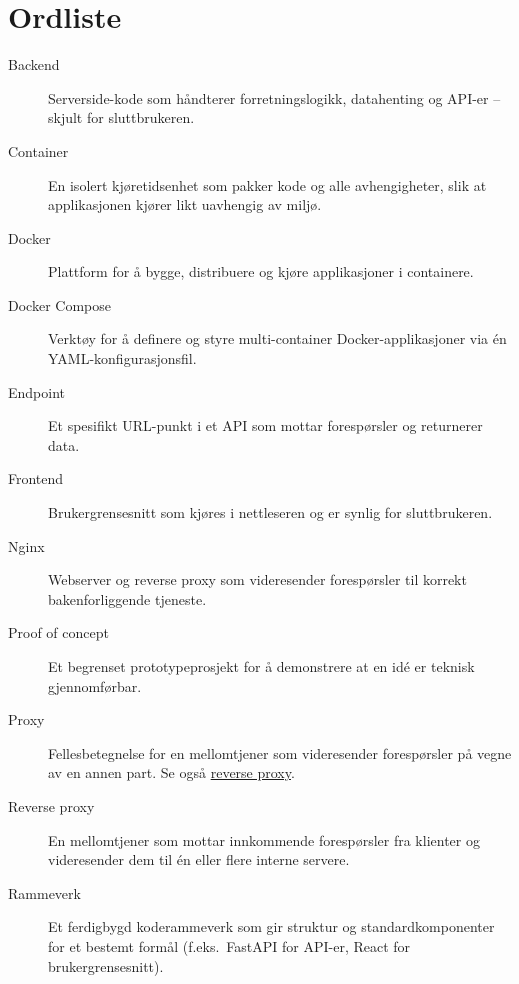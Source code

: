 \section*{Ordliste}

\begin{description}
    \item[\hypertarget{ord:backend}{Backend}] Serverside-kode som håndterer
        forretningslogikk, datahenting og API-er -- skjult for sluttbrukeren.

    \item[\hypertarget{ord:container}{Container}] En isolert kjøretidsenhet som
        pakker kode og alle avhengigheter, slik at applikasjonen kjører likt
        uavhengig av miljø.

    \item[\hypertarget{ord:docker}{Docker}] Plattform for å bygge, distribuere og
        kjøre applikasjoner i containere.

    \item[\hypertarget{ord:docker-compose}{Docker Compose}] Verktøy for å definere
        og styre multi-container Docker-applikasjoner via én YAML-konfigurasjonsfil.

    \item[\hypertarget{ord:endpoint}{Endpoint}] Et spesifikt URL-punkt i et API som
        mottar forespørsler og returnerer data.

    \item[\hypertarget{ord:frontend}{Frontend}] Brukergrensesnitt som kjøres i
        nettleseren og er synlig for sluttbrukeren.

    \item[\hypertarget{ord:nginx}{Nginx}] Webserver og reverse proxy som videresender
        forespørsler til korrekt bakenforliggende tjeneste.

    \item[\hypertarget{ord:proof-of-concept}{Proof of concept}] Et begrenset
        prototypeprosjekt for å demonstrere at en idé er teknisk gjennomførbar.

    \item[\hypertarget{ord:proxy}{Proxy}] Fellesbetegnelse for en mellomtjener som
        videresender forespørsler på vegne av en annen part. Se også
        \hyperlink{ord:reverse-proxy}{reverse proxy}.

    \item[\hypertarget{ord:reverse-proxy}{Reverse proxy}] En mellomtjener som mottar
        innkommende forespørsler fra klienter og videresender dem til én eller flere
        interne servere.

    \item[\hypertarget{ord:rammeverk}{Rammeverk}] Et ferdigbygd koderammeverk som gir
        struktur og standardkomponenter for et bestemt formål (f.eks.\ FastAPI for
        API-er, React for brukergrensesnitt).
\end{description}
